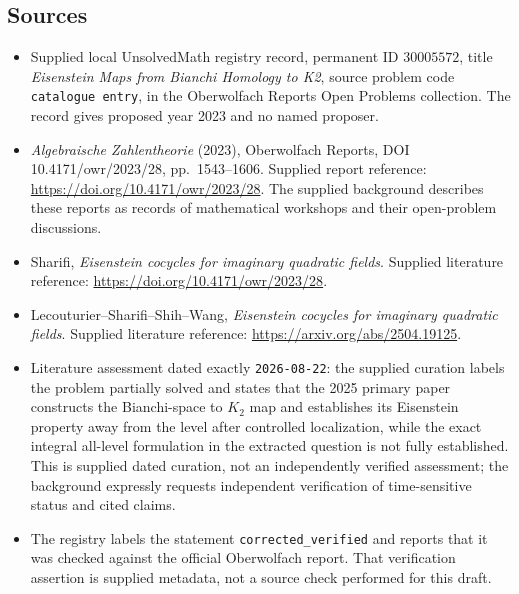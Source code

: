 \documentclass[11pt]{article}
\begin{document}
\subsection{Sources}
\begin{itemize}
\item Supplied local UnsolvedMath registry record, permanent ID \(30005572\), title \emph{Eisenstein Maps from Bianchi Homology to K2}, source problem code \texttt{catalogue entry}, in the Oberwolfach Reports Open Problems collection. The record gives proposed year 2023 and no named proposer.
\item \emph{Algebraische Zahlentheorie} (2023), Oberwolfach Reports, DOI 10.4171/owr/2023/28, pp.\ 1543--1606. Supplied report reference: \url{https://doi.org/10.4171/owr/2023/28}. The supplied background describes these reports as records of mathematical workshops and their open-problem discussions.
\item Sharifi, \emph{Eisenstein cocycles for imaginary quadratic fields}. Supplied literature reference: \url{https://doi.org/10.4171/owr/2023/28}.
\item Lecouturier--Sharifi--Shih--Wang, \emph{Eisenstein cocycles for imaginary quadratic fields}. Supplied literature reference: \url{https://arxiv.org/abs/2504.19125}.
\item Literature assessment dated exactly \texttt{2026-08-22}: the supplied curation labels the problem partially solved and states that the 2025 primary paper constructs the Bianchi-space to \(K_2\) map and establishes its Eisenstein property away from the level after controlled localization, while the exact integral all-level formulation in the extracted question is not fully established. This is supplied dated curation, not an independently verified assessment; the background expressly requests independent verification of time-sensitive status and cited claims.
\item The registry labels the statement \texttt{corrected\_verified} and reports that it was checked against the official Oberwolfach report. That verification assertion is supplied metadata, not a source check performed for this draft.
\end{itemize}
\end{document}
